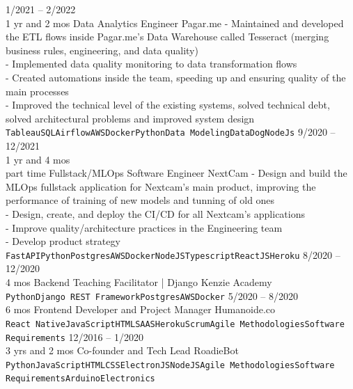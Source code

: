 \documentclass[9pt]{developercv} %
\begin{document}
\begin{entrylist}
	\entry
		{1/2021 -- 2/2022 \\\footnotesize{1 yr and 2 mos}}
		{Data Analytics Engineer}
		{Pagar.me}
		{- Maintained and developed the ETL flows inside Pagar.me's Data Warehouse called Tesseract (merging business rules, engineering, and data quality)\\
  - Implemented data quality monitoring to data transformation flows\\
  - Created automations inside the team, speeding up and ensuring quality of the main processes \\
  - Improved the technical level of the existing systems, solved technical debt, solved architectural problems and improved system design
\\\texttt{Tableau}\slashsep\texttt{SQL}\slashsep\texttt{Airflow}\slashsep\texttt{AWS}\slashsep\texttt{Docker}\slashsep\texttt{Python}\slashsep\texttt{Data Modeling}\slashsep\texttt{DataDog}\slashsep\texttt{NodeJs}}
	\entry
		{9/2020 -- 12/2021\\\footnotesize{1 yr and 4 mos\\part time}}
		{Fullstack/MLOps Software Engineer}
		{NextCam}
		{- Design and build the MLOps fullstack application for Nextcam's main product, improving the performance of training of new models and tunning of old ones\\
- Design, create, and deploy the CI/CD for all Nextcam's applications\\
- Improve quality/architecture practices in the Engineering team\\
- Develop product strategy
\\\texttt{FastAPI}\slashsep\texttt{Python}\slashsep\texttt{Postgres}\slashsep\texttt{AWS}\slashsep\texttt{Docker}\slashsep\texttt{NodeJS}\slashsep\texttt{Typescript}\slashsep\texttt{ReactJS}\slashsep\texttt{Heroku}}
\entry
		{8/2020 -- 12/2020\\\footnotesize{4 mos}}
		{Backend Teaching Facilitator | Django}
		{Kenzie Academy}
		{
\\\texttt{Python}\slashsep\texttt{Django REST Framework}\slashsep\texttt{Postgres}\slashsep\texttt{AWS}\slashsep\texttt{Docker}}
	\entry
		{5/2020 -- 8/2020\\\footnotesize{6 mos}}
		{Frontend Developer and Project Manager}
		{Humanoide.co}
		{
\\\texttt{React Native}\slashsep\texttt{JavaScript}\slashsep\texttt{HTML}\slashsep\texttt{SAAS}\slashsep\texttt{Heroku}\slashsep\texttt{Scrum}\slashsep\texttt{Agile Methodologies}\slashsep\texttt{Software Requirements}}
	\entry
		{12/2016 -- 1/2020\\\footnotesize{3 yrs and 2 mos}}
		{Co-founder and Tech Lead}
		{RoadieBot}
		{
\\\texttt{Python}\slashsep\texttt{JavaScript}\slashsep\texttt{HTML}\slashsep\texttt{CSS}\slashsep\texttt{ElectronJS}\slashsep\texttt{NodeJS}\slashsep\texttt{Agile Methodologies}\slashsep\texttt{Software Requirements}\slashsep\texttt{Arduino}\slashsep\texttt{Electronics}}
\end{entrylist}
\end{document}
